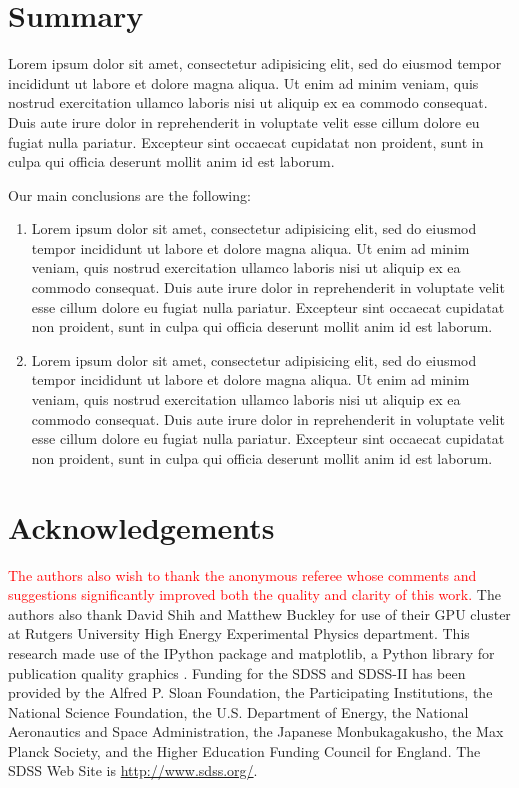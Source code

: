 \documentclass[fleqn,usenatbib]{mnras}
\newcommand{\editorial}[1]{\textcolor{red}{#1}}
\begin{document}
\section{Summary}\label{sec:summary}



Lorem ipsum dolor sit amet, consectetur adipisicing elit, sed do eiusmod tempor incididunt ut labore et dolore magna aliqua. Ut enim ad minim veniam, quis nostrud exercitation ullamco laboris nisi ut aliquip ex ea commodo consequat. Duis aute irure dolor in reprehenderit in voluptate velit esse cillum dolore eu fugiat nulla pariatur. Excepteur sint occaecat cupidatat non proident, sunt in culpa qui officia deserunt mollit anim id est laborum.

Our main conclusions are the following:
\begin{enumerate}
	\item Lorem ipsum dolor sit amet, consectetur adipisicing elit, sed do eiusmod tempor incididunt ut labore et dolore magna aliqua. Ut enim ad minim veniam, quis nostrud exercitation ullamco laboris nisi ut aliquip ex ea commodo consequat. Duis aute irure dolor in reprehenderit in voluptate velit esse cillum dolore eu fugiat nulla pariatur. Excepteur sint occaecat cupidatat non proident, sunt in culpa qui officia deserunt mollit anim id est laborum.

	\item Lorem ipsum dolor sit amet, consectetur adipisicing elit, sed do eiusmod tempor incididunt ut labore et dolore magna aliqua. Ut enim ad minim veniam, quis nostrud exercitation ullamco laboris nisi ut aliquip ex ea commodo consequat. Duis aute irure dolor in reprehenderit in voluptate velit esse cillum dolore eu fugiat nulla pariatur. Excepteur sint occaecat cupidatat non proident, sunt in culpa qui officia deserunt mollit anim id est laborum.
\end{enumerate}

\section*{Acknowledgements}
\editorial{The authors also wish to thank the anonymous referee whose comments and suggestions significantly improved both the quality and clarity of this work.}
The authors also thank David Shih and Matthew Buckley for use of their GPU cluster at Rutgers University High Energy Experimental Physics department. %
This research made use of the {\sc IPython} package \citep{Perez2007} and {\sc matplotlib}, a Python library for publication quality graphics \citep{Hunter2007}. Funding for the SDSS and SDSS-II has been provided by the Alfred P. Sloan Foundation, the Participating Institutions, the National Science Foundation, the U.S. Department of Energy, the National Aeronautics and Space Administration, the Japanese Monbukagakusho, the Max Planck Society, and the Higher Education Funding Council for England. The SDSS Web Site is \url{http://www.sdss.org/}.
\end{document}
